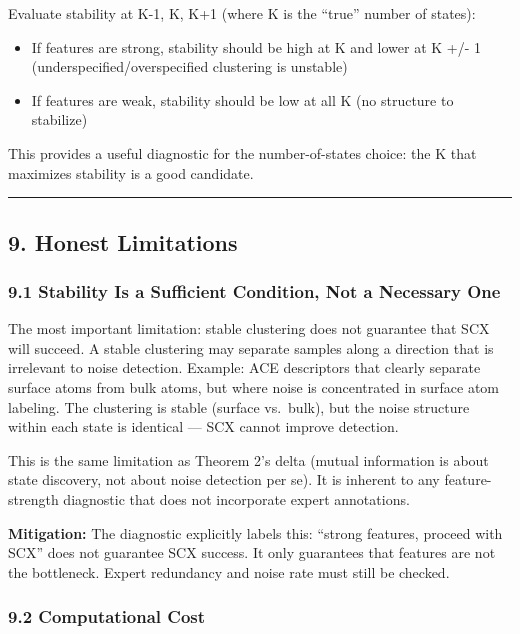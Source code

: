 \documentclass[
  12pt,
]{article}
\providecommand{\tightlist}{%
  \setlength{\itemsep}{0pt}\setlength{\parskip}{0pt}}
\begin{document}
Evaluate stability at K-1, K, K+1 (where K is the ``true'' number of
states):

\begin{itemize}
\tightlist
\item
  If features are strong, stability should be high at K and lower at K
  +/- 1 (underspecified/overspecified clustering is unstable)
\item
  If features are weak, stability should be low at all K (no structure
  to stabilize)
\end{itemize}

This provides a useful diagnostic for the number-of-states choice: the K
that maximizes stability is a good candidate.

\begin{center}\rule{0.5\linewidth}{0.5pt}\end{center}

\subsection{9. Honest Limitations}\label{honest-limitations}

\subsubsection{9.1 Stability Is a Sufficient Condition, Not a Necessary
One}\label{stability-is-a-sufficient-condition-not-a-necessary-one}

The most important limitation: stable clustering does not guarantee that
SCX will succeed. A stable clustering may separate samples along a
direction that is irrelevant to noise detection. Example: ACE
descriptors that clearly separate surface atoms from bulk atoms, but
where noise is concentrated in surface atom labeling. The clustering is
stable (surface vs.~bulk), but the noise structure within each state is
identical --- SCX cannot improve detection.

This is the same limitation as Theorem 2's delta (mutual information is
about state discovery, not about noise detection per se). It is inherent
to any feature-strength diagnostic that does not incorporate expert
annotations.

\textbf{Mitigation:} The diagnostic explicitly labels this: ``strong
features, proceed with SCX'' does not guarantee SCX success. It only
guarantees that features are not the bottleneck. Expert redundancy and
noise rate must still be checked.

\subsubsection{9.2 Computational Cost}\label{computational-cost}
\end{document}
